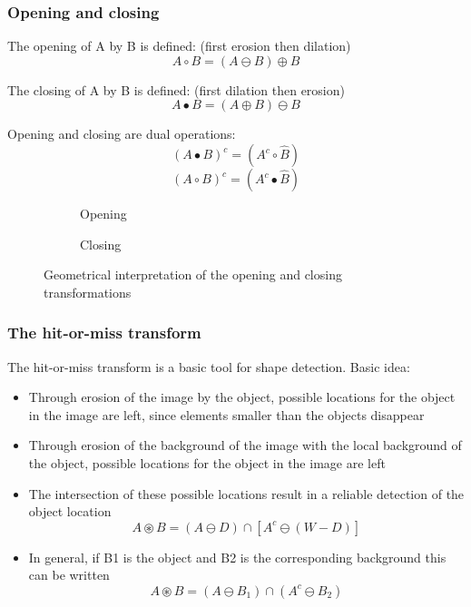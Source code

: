 \subsubsection{Opening and closing}
The opening of A by B is defined: (first erosion then dilation)
\[
	A \circ B = (A \ominus B) \oplus B
\]

The closing of A by B is defined: (first dilation then erosion)
\[
	A  \bullet B = (A \oplus B) \ominus B
\]

Opening and closing are dual operations: 
\[
	(A  \bullet B)^c = (A^c \circ \hat{B})
\]
\[
	(A \circ B)^c = (A^c \bullet \hat{B})
\]

\begin{figure}[h!]
	\centering
	\begin{subfigure}[b]{0.45\textwidth}
		\centering
		\caption{Opening}
	\end{subfigure}
	\begin{subfigure}[b]{0.45\textwidth}
		\centering
		\caption{Closing}
	\end{subfigure}
	\caption{Geometrical interpretation of the opening and closing transformations}
\end{figure}


\subsubsection{The hit-or-miss transform}
The hit-or-miss transform is a basic tool for shape detection. Basic idea:
\begin{itemize}
	\item Through erosion of the image by the object, possible locations for the object in the image are left, since elements smaller than the objects disappear
	
	\item Through erosion of the background of the image with the local background of the object, possible locations for the object in the image are left
	
	\item The intersection of these possible locations result in a reliable  detection of the object location
	\[
		A \circledast B = (A \ominus D) \cap [ A^c \ominus (W-D)]
	\]
	
	\item In general, if B1 is the object and B2 is the corresponding background this can be written
	\[
		A \circledast B = (A \ominus B_1)\cap (A^c \ominus B_2)	
	\]	
\end{itemize}



